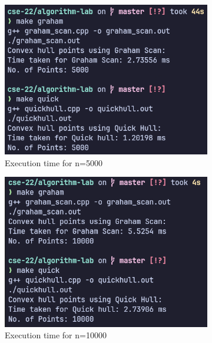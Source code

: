 \begin{figure}[H]
    \centering
    \begin{subfigure}[b]{0.4\textwidth}
        \centering
        \includegraphics[width=\textwidth]{./img/lab2/p5k.png}
        \caption{Execution time for n=5000}
    \end{subfigure}
    \hfill
    \begin{subfigure}[b]{0.4\textwidth}
        \centering
        \includegraphics[width=\textwidth]{./img/lab2/p10k.png}
        \caption{Execution time for n=10000}
    \end{subfigure}
    \hfill
    \begin{subfigure}[b]{0.4\textwidth}
        \centering

\end{subfigure}
\end{figure}

